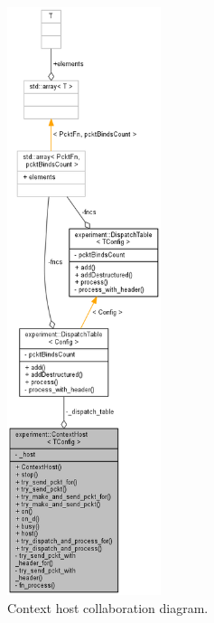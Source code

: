 \documentclass[12pt]{report}
\newcommand{\+}{\discretionary{\mbox{\scriptsize$\hookleftarrow$}}{}{}}
\begin{document}
                \newpage

                \begin{figure}[H]
                \caption{Context host collaboration diagram.}
                \centering
                \includegraphics[width=0.4\textwidth]{d/coll/coll_ctxhost.png}
                \end{figure}

                \newpage
\end{document}
